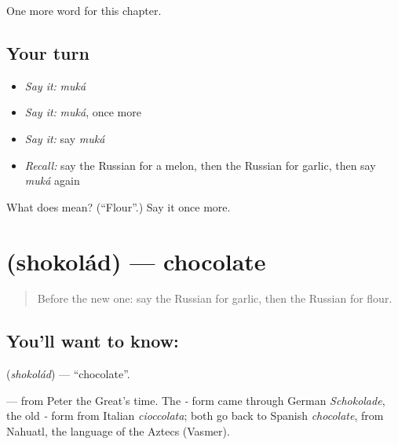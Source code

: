 \begin{grammarlens}[title={What you've built}]
One more word for this chapter.
\end{grammarlens}

\subsection*{Your turn}
\begin{itemize}
\raggedright
  \item \emph{Say it:} \emph{muká}
  \item \emph{Say it:} \emph{muká}, once more
  \item \emph{Say it:} say \emph{muká}
  \item \emph{Recall:} say the Russian for a melon, then the Russian for garlic, then say \emph{muká} again
\end{itemize}

\begin{tcolorbox}[breakable,colback=teal!4,colframe=teal!35!black,title={Before you move on}]
What does  mean? (\textquotedblleft{}Flour\textquotedblright{}.) Say it once more.
\end{tcolorbox}
\section[\texorpdfstring{\ru{шоколад} (shokolád)}{шоколад (shokolád)}]{ (shokolád) — chocolate}

\label{lesson:RU-C105-chocolate}



\begin{quote}
Before the new one: say the Russian for garlic, then the Russian for flour.
\end{quote}

\subsection*{You'll want to know: }
\textbf{} (\emph{shokolád}) — \textquotedblleft{}chocolate\textquotedblright{}.

\begin{cousinweb}
\textbf{} — from Peter the Great's time. The \emph{-} form came through German \emph{Schokolade}, the old \emph{-} form from Italian \emph{cioccolata}; both go back to Spanish \emph{chocolate}, from Nahuatl, the language of the Aztecs (Vasmer).
\end{cousinweb}

